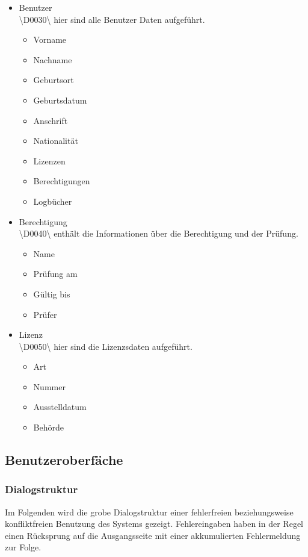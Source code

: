 \documentclass[a4paper]{article} %
\begin{document}
\begin{itemize}
        \noindent \vspace{0.5cm}
        \item Benutzer\\
        \textbackslash D0030\textbackslash{} hier sind alle Benutzer Daten aufgeführt.
        \begin{itemize}
            \item Vorname
            \item Nachname
            \item Geburtsort
            \item Geburtsdatum
            \item Anschrift
            \item Nationalität
            \item Lizenzen
            \item Berechtigungen
            \item Logbücher
        \end{itemize}
        \item Berechtigung\\
        \textbackslash D0040\textbackslash{} enthält die Informationen über die Berechtigung und der Prüfung.
        \begin{itemize}
            \item Name
            \item Prüfung am
            \item Gültig bis
            \item Prüfer
        \end{itemize}
        \item Lizenz\\
        \textbackslash D0050\textbackslash{} hier sind die Lizenzsdaten aufgeführt.
        \begin{itemize}
            \item Art
            \item Nummer
            \item Ausstelldatum
            \item Behörde
        \end{itemize}
    \end{itemize}
    
    \pagebreak
    \subsection{Benutzeroberfäche}
    \vspace{1cm}
    \subsubsection{Dialogstruktur}
    Im Folgenden wird die grobe Dialogstruktur einer fehlerfreien beziehungsweise konfliktfreien Benutzung des Systems gezeigt. Fehlereingaben haben in der Regel einen Rücksprung auf die Ausgangsseite mit einer akkumulierten Fehlermeldung zur Folge.\\
\end{document}
